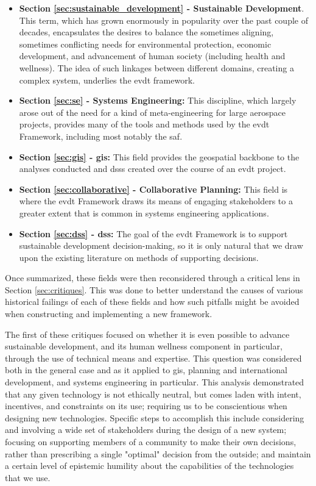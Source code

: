 \begin{itemize}[itemsep=0pt,parsep=0pt]
	\item{\textbf{Section \ref{sec:sustainable_development} - Sustainable Development}. This term, which has grown enormously in popularity over the past couple of decades, encapsulates the desires to balance the sometimes aligning, sometimes conflicting needs for environmental protection, economic development, and advancement of human society (including health and wellness). The idea of such linkages between different domains, creating a complex system, underlies the \ac{evdt} framework.}
	\item{\textbf{Section \ref{sec:se} - Systems Engineering:} This discipline, which largely arose out of the need for a kind of meta-engineering for large aerospace projects, provides many of the tools and methods used by the \ac{evdt} Framework, including most notably the \acf{saf}.}
	\item{\textbf{Section \ref{sec:gis} - \acf{gis}:} This field provides the geospatial backbone to the analyses conducted and \acp{dss} created over the course of an \ac{evdt} project.} 
	\item{\textbf{Section \ref{sec:collaborative} - Collaborative Planning:} This field is where the \ac{evdt} Framework draws its means of engaging stakeholders to a greater extent that is common in systems engineering applications.}
	\item{\textbf{Section \ref{sec:dss} - \acf{dss}:} The goal of the \ac{evdt} Framework is to support sustainable development decision-making, so it is only natural that we draw upon the existing literature on methods of supporting decisions.}
\end{itemize}

Once summarized, these fields were then reconsidered through a critical lens in Section \ref{sec:critiques}. This was done to better understand the causes of various historical failings of each of these fields and how such pitfalls might be avoided when constructing and implementing a new framework. 

The first of these critiques focused on whether it is even possible to advance sustainable development, and its human wellness component in particular, through the use of technical means and expertise. This question was considered both in the general case and as it applied to \ac{gis}, planning and international development, and systems engineering in particular. This analysis demonstrated that any given technology is not ethically neutral, but comes laden with intent, incentives, and constraints on its use; requiring us to be conscientious when designing new technologies. Specific steps to accomplish this include considering and involving a wide set of stakeholders during the design of a new system; focusing on supporting members of a community to make their own decisions, rather than prescribing a single "optimal" decision from the outside; and maintain a certain level of epistemic humility about the capabilities of the technologies that we use.

